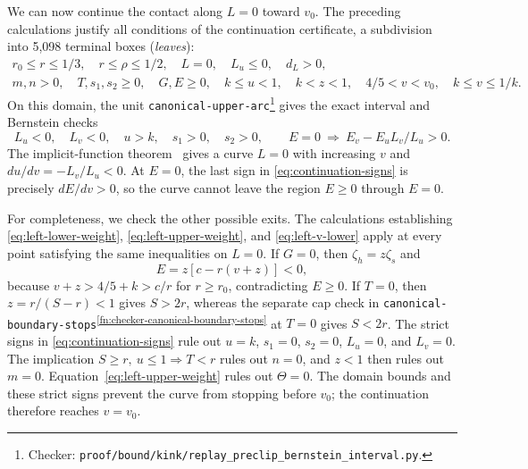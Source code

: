 \documentclass[11pt]{article}
\theoremstyle{remark}
\theoremstyle{plain}
\begin{document}
We can now continue the contact along $L=0$ toward $v_0$.
The preceding calculations justify all conditions of the
continuation certificate, a subdivision into 5,098 terminal boxes
(\emph{leaves}):
\begin{equation}
 \begin{gathered}
 r_0\le r\le1/3,\quad r\le\rho\le1/2,\quad
 L=0,\quad L_u\le0,\quad d_L>0,\\
 m,n>0,\quad T,s_1,s_2\ge0,\quad G,E\ge0,\quad
 k\le u<1,\quad k<z<1,\quad 4/5<v<v_0,\quad k\le v\le1/k.
 \end{gathered}
 \label{eq:continuation-domain}
\end{equation}
On this domain, the unit \nolinkurl{canonical-upper-arc}\footnote{Checker:
\nolinkurl{proof/bound/kink/replay_preclip_bernstein_interval.py}.\label{fn:checker-canonical-upper-arc}} gives
the exact interval and Bernstein checks
\begin{equation}
 L_u<0,\quad L_v<0,\quad u>k,\quad s_1>0,\quad s_2>0,
 \qquad
 E=0\ \Longrightarrow\ E_v-E_uL_v/L_u>0.
 \label{eq:continuation-signs}
\end{equation}
The implicit-function theorem~\cite{rudin1976}
gives a curve $L=0$ with increasing
$v$ and $du/dv=-L_v/L_u<0$. At $E=0$, the last sign in
\eqref{eq:continuation-signs} is precisely $dE/dv>0$, so the curve
cannot leave the region $E\ge0$ through $E=0$.

For completeness, we check the other possible exits.
The calculations establishing \eqref{eq:left-lower-weight},
\eqref{eq:left-upper-weight}, and \eqref{eq:left-v-lower} apply
at every point satisfying the same inequalities on $L=0$.
If $G=0$, then $\zeta_h=z\zeta_s$ and
\[
 E=z[c-r(v+z)]<0,
\]
because $v+z>4/5+k>c/r$ for $r\ge r_0$, contradicting $E\ge0$.
If $T=0$, then $z=r/(S-r)<1$ gives $S>2r$, whereas the separate
cap check in \nolinkurl{canonical-boundary-stops}\textsuperscript{\ref{fn:checker-canonical-boundary-stops}} at $T=0$ gives $S<2r$.
The strict signs in \eqref{eq:continuation-signs} rule out
$u=k$, $s_1=0$, $s_2=0$, $L_u=0$, and $L_v=0$.
The implication $S\ge r,\ u\le1\Rightarrow T<r$ rules out $n=0$,
and $z<1$ then rules out $m=0$. Equation~\eqref{eq:left-upper-weight}
rules out $\Theta=0$.
The domain bounds and these strict signs prevent the curve from
stopping before $v_0$; the continuation therefore reaches $v=v_0$.
\end{document}
